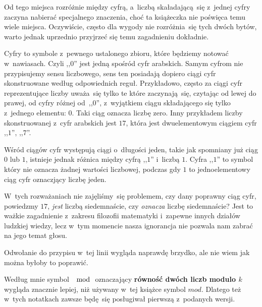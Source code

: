 \documentclass[a4paper,11pt]{article}
\begin{document}
\vspace{\spaceFour}





 Od tego miejsca rozróżnie między cyfrą, a~liczbą skaładającą~się 
z~jednej cyfry zaczyna nabierać specjalnego znaczenia, choć ta książeczka
nie poświęca temu wiele miejsca. Oczywiście, często dla wygody nie rozróżnia~się
tych dwóch bytów, warto jednak uprzednio przyjrzeć się temu zagadnieniu dokładnie.

Cyfry to symbole z~pewnego ustalonego zbioru, które będziemy notować w~nawiasach. Czyli ,,$0$''
jest jedną spośród cyfr arabskich. Samym cyfrom nie przypisujemy sensu liczbowego, sens ten 
posiadają dopiero ciągi cyfr skonstruowane według odpowiednich reguł. Przykładowo, często za
ciągi cyfr reprezentujące liczby uważa~się tylko te które zaczynają~się, czytając od lewej do prawej,
od cyfry różnej od~,,$0$'', z~wyjątkiem ciągu składającego się tylko z~jednego elementu: $0$. 
Taki ciąg oznacza liczbę zero. Inny przykładem liczby skonstruowanej z~cyfr arabskich jest $17$, która 
jest dwuelementowym ciągiem cyfr ,,$1$'', ,,$7$''.

Wśród ciągów cyfr występują ciągi o~długości jeden, takie jak spomniany już ciąg $0$ lub $1$,
istnieje jednak różnica między cyfrą ,,$1$'' i~liczbą $1$. Cyfra ,,$1$'' to symbol który nie oznacza
żadnej wartości liczbowej, podczas gdy $1$ to jednoelementowy ciąg cyfr oznaczjący liczbę jeden.

W~tych rozważaniach nie zajęliśmy~się problemem, czy dany poprawny ciąg cyfr, powiedzmy $17$, \textit{jest} liczbą
siedemnaście, czy \textit{oznacza} liczbę siedemnaście? Jest to ważkie zagadnienie z~zakresu filozofii matematyki
i~zapewne innych działów ludzkiej wiedzy, lecz w~tym momencie nasza ignorancja nie pozwala nam zabrać na jego
temat głosu.

\vspace{\spaceFour}





 Odwołanie do przypisu w~tej linii wygląda naprawdę brzydko, 
ale nie wiem jak można byłoby to poprawić.

\vspace{\spaceFour}





 Według mnie symbol $\mod$ oznaczający \textbf{równość dwóch liczb modulo $k$}
wygląda znacznie lepiej, niż używany w~tej książce symbol $mod$. Dlatego też w~tych notatkach
zawsze będę~się posługiwał pierwszą z~podanych wersji.
\end{document}
